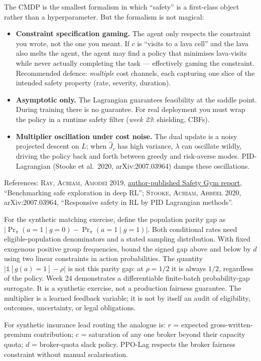 \documentclass[11pt,oneside]{scrbook}
\begin{document}
\begin{safetyangle}
The CMDP is the smallest formalism in which ``safety'' is a first-class object
rather than a hyperparameter. But the formalism is not magical:
\begin{itemize}[leftmargin=*]
  \item \textbf{Constraint specification gaming.} The agent only respects the
        constraint you wrote, not the one you meant. If $c$ is ``visits to a
        lava cell'' and the lava also melts the agent, the agent may find a
        policy that minimises lava-visits while never actually completing the
        task --- effectively gaming the constraint. Recommended defence:
        \emph{multiple} cost channels, each capturing one slice of the
        intended safety property (rate, severity, duration).
  \item \textbf{Asymptotic only.} The Lagrangian guarantees feasibility at the
        saddle point. During training there is no guarantee. For real
        deployment you must wrap the policy in a runtime safety filter
        (\emph{week 23}: shielding, CBFs).
  \item \textbf{Multiplier oscillation under cost noise.} The dual update is
        a noisy projected descent on $L$; when $\hat J_c$ has high variance,
        $\lambda$ can oscillate wildly, driving the policy back and forth
        between greedy and risk-averse modes. PID-Lagrangian (Stooke et al.\
        2020, arXiv:2007.03964) damps these oscillations.
\end{itemize}
References: \textsc{Ray, Achiam, Amodei 2019}, \href{https://cdn.openai.com/safexp-short.pdf}{author-published Safety Gym report}, ``Benchmarking
safe exploration in deep RL''; \textsc{Stooke, Achiam, Abbeel 2020},
arXiv:2007.03964, ``Responsive safety in RL by PID Lagrangian methods''.
\end{safetyangle}

\begin{matching}
For the synthetic matching exercise, define the population parity gap as
$|\Pr_\pi(a=1\mid g=0)-\Pr_\pi(a=1\mid g=1)|$. Both conditional rates
need eligible-population denominators and a stated sampling distribution.
With fixed exogenous positive group frequencies, bound the signed gap
above and below by $d$ using two linear constraints in action probabilities.
The quantity $|\mathbb{1}[g(a)=1]-\rho|$ is not this parity gap: at
$\rho=1/2$ it is always $1/2$, regardless of the policy.
Week 24 demonstrates a differentiable finite-batch probability-gap
surrogate. It is a synthetic exercise, not a production fairness guarantee.
The multiplier is a learned feedback variable; it is not by itself an
audit of eligibility, outcomes, uncertainty, or legal obligations.

For synthetic insurance lead routing the analogue is: $r$ = expected gross-written-premium
contribution; $c$ = saturation of any one broker beyond their capacity quota;
$d$ = broker-quota slack policy. PPO-Lag respects the broker fairness
constraint without manual scalarisation.
\end{matching}
\end{document}
